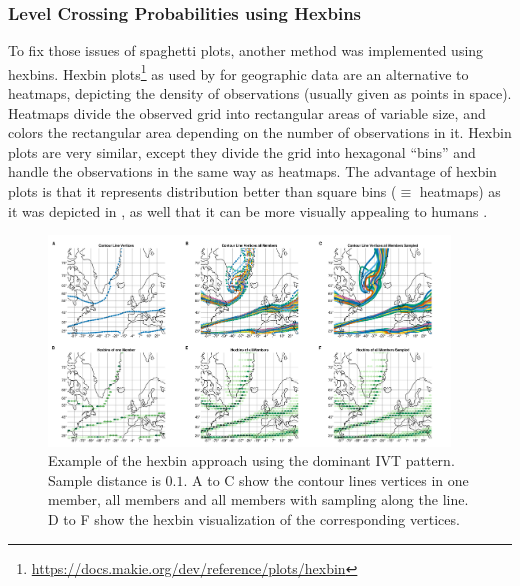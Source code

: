 \subsubsection{Level Crossing Probabilities using Hexbins}

To fix those issues of spaghetti plots, another method was implemented using hexbins. 
Hexbin plots\footnote{\url{https://docs.makie.org/dev/reference/plots/hexbin}} as used by  for geographic data are an alternative to heatmaps, depicting the density of observations (usually given as points in space). 
Heatmaps divide the observed grid into rectangular areas of variable size, and colors the rectangular area depending on the number of observations in it. 
Hexbin plots are very similar, except they divide the grid into hexagonal \enquote{bins} and handle the observations in the same way as heatmaps. 
The advantage of hexbin plots is that it represents distribution better than square bins ($\equiv$ heatmaps) as it was depicted in \cite{carr_hexagon_1992}, as well that it can be more visually appealing to humans \cite{carr_hexagon_1992}. 


\begin{figure}
  \begin{center}
    \includegraphics[width=0.95\textwidth]{figures/hexbin_approach_overview.png}
  \end{center}
  \caption{Example of the hexbin approach using the dominant IVT pattern. Sample distance is $0.1$. A to C show the contour lines vertices in one member, all members and all members with sampling along the line. D to F show the hexbin visualization of the corresponding vertices.}\label{fig:hexbin overview}
\end{figure}


